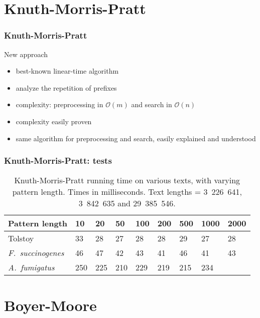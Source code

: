 \documentclass{beamer}
\begin{document}
\section{Knuth-Morris-Pratt}
\label{sec:knuth-morris-pratt}

\begin{frame}
  \frametitle{Knuth-Morris-Pratt}

  \begin{block}{New approach}
    \begin{itemize}
    \item best-known linear-time algorithm
    \item analyze the repetition of prefixes
    \item complexity: preprocessing in $\mathcal{O}(m)$ and search in
      $\mathcal{O}(n)$
    \item complexity easily proven
    \item same algorithm for preprocessing and search, easily
      explained and understood
    \end{itemize}
  \end{block}
\end{frame}

\begin{frame}
  \frametitle{Knuth-Morris-Pratt: tests}

  \begin{table}[ht]
    \centering
    \begin{tabular}{lllllllll}
      \toprule[1pt]
      Pattern length & 10 & 20 & 50 & 100 & 200 & 500 & 1000 & 2000 \\
      \midrule
      Tolstoy & 33 & 28 & 27 & 28 & 28 & 29 & 27 & 28 \\
      \emph{F.\ succinogenes} & 46 & 47 & 42 & 43 & 41 & 46 & 41 & 43 \\
      \emph{A.\ fumigatus} & 250 & 225 & 210 & 229 & 219 & 215 & 234 & \\
      \bottomrule[1pt]
    \end{tabular}
    \caption{Knuth-Morris-Pratt running time on various texts, with varying pattern length. Times in milliseconds. Text lengths = 3~226~641, 3~842~635 and 29~385~546.}
  \end{table}
\end{frame}


\section{Boyer-Moore}
\label{sec:boyer-moore}
\end{document}

